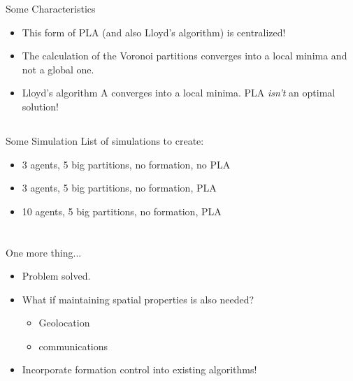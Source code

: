 \documentclass[t]{beamer}
\begin{document}
\begin{frame}[label=planotice]{Some Characteristics}
\begin{itemize}
\item This form of PLA (and also Lloyd's algorithm) is centralized!
\item The calculation of the Voronoi partitions converges into a local minima and not a global one.
\item Lloyd's algorithm A converges into a local minima. PLA \emph{isn't} an optimal solution!
\end{itemize}

\end{frame}
\subsection[Simulations]{}
\begin{frame}[label=sl3]{Some Simulation}
List of simulations to create:
\begin{itemize}
\item 3 agents, 5 big partitions, no formation, no PLA
\item 3 agents, 5 big partitions, no formation, PLA
\item 10 agents, 5 big partitions, no formation, PLA
\end{itemize}
\end{frame}


\section[Formation Control and PLA]{}
\begin{frame}[label=onemorething]{One more thing...}
\begin{itemize}
\item<1-> Problem solved.
\item<2-> What if maintaining spatial properties is also needed? \begin{itemize}
	\item<2-> Geolocation
	\item<2-> communications
\end{itemize}
\item<3-> Incorporate formation control into existing algorithms!
\end{itemize}
\end{frame}
\end{document}

